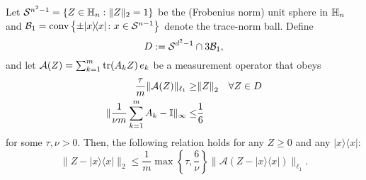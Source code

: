\begin{proposition} \label{prop:nsp_implication}
  Let $\mathcal{S}^{n^2-1}=\left\{  Z \in \mathbb{H}_n: \|  Z \|_2=1 \right\}$ be the (Frobenius norm) unit sphere in $\mathbb{H}_n$ and $\mathcal{B}_1 = \mathrm{conv} \left\{ \pm | x \rangle \! \langle  x| \colon  x \in \mathcal{S}^{n-1} \right\}$ denote the trace-norm ball.
  Define
  \begin{equation}
    D := \mathcal{S}^{d^2-1} \cap 3 \mathcal{B}_1, \label{eq:D}
  \end{equation}
  and let $\mathcal{A}( Z) = \sum_{k=1}^m \operatorname{tr} ( A_k  Z ) \,  e_k$ be a measurement operator that obeys
  \begin{align}
      \frac{ \tau}{m} \| \mathcal{A}( Z) \|_{\ell_1} \geq& {\Vert Z\Vert}_2 \quad \forall  Z \in D \label{eq:nsp}\\
      \| \frac{1}{\nu m}\sum_{k=1}^m  A_k -  \mathbb{I} \|_\infty \leq& \frac{1}{6}\label{eq:approx_povm}
  \end{align}
  for some $\tau,\nu >0$.
  Then, the following relation holds for any $ Z \geq 0$ and any $|{x} \rangle \! \langle {x}|$:
  \begin{equation}
    \|  Z - |{x} \rangle \! \langle {x}| \|_2 \leq \frac{1}{m} \max \left\{ \tau, \frac{6}{\nu} \right\}  \| \mathcal{A}( Z-|{x} \rangle \! \langle {x}|) \|_{\ell_1}. \label{eq:rec_guarantee}
  \end{equation}
\end{proposition}



